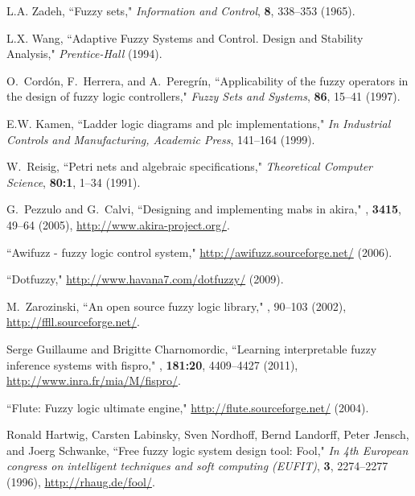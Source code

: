 \documentclass[11pt,twoside]{article}
\begin{document}
\begin{multicols}{2}
\begin{thebibliography}{10}
L.A. Zadeh,
\newblock ``Fuzzy sets," {\it Information and Control}, {\bf 8}, 338--353 (1965).

L.X. Wang,
\newblock ``Adaptive Fuzzy Systems and Control. Design and Stability
  Analysis," {\it Prentice-Hall} (1994).

O.~Cord\'on, F.~Herrera, and A.~Peregr\'in,
\newblock ``Applicability of the fuzzy operators in the design of fuzzy logic
  controllers," {\it Fuzzy Sets and Systems}, {\bf 86}, 15--41 (1997).

E.W. Kamen,
\newblock ``Ladder logic diagrams and plc implementations," {\it In Industrial Controls and Manufacturing, Academic Press}, 141--164 (1999).

W.~Reisig,
\newblock ``Petri nets and algebraic specifications," {\it Theoretical Computer Science}, {\bf 80:1}, 1--34 (1991).

G.~Pezzulo and G.~Calvi,
\newblock ``Designing and implementing mabs in akira,"
, {\bf 3415}, 49--64 (2005), 
\newblock \url{http://www.akira-project.org/}.

``Awifuzz - fuzzy logic control system,"
\newblock \url{http://awifuzz.sourceforge.net/} (2006).

``Dotfuzzy," \url{http://www.havana7.com/dotfuzzy/} (2009).

M.~Zarozinski,
\newblock ``An open source fuzzy logic library,"
, 90--103 (2002), 
\newblock \url{http://ffll.sourceforge.net/}.

Serge Guillaume and Brigitte Charnomordic,
\newblock ``Learning interpretable fuzzy inference systems with fispro,"
,
  {\bf 181:20}, 4409--4427 (2011), 
\newblock \url{http://www.inra.fr/mia/M/fispro/}.

``Flute: Fuzzy logic ultimate engine,"
\newblock \url{http://flute.sourceforge.net/} (2004).

Ronald Hartwig, Carsten Labinsky, Sven Nordhoff, Bernd Landorff, Peter Jensch,
  and Joerg Schwanke,
\newblock ``Free fuzzy logic system design tool: Fool," {\it In 4th European congress on intelligent techniques and soft computing (EUFIT)}, {\bf 3}, 2274--2277 (1996), \url{http://rhaug.de/fool/}.


\end{thebibliography}
\end{multicols}
\end{document}
